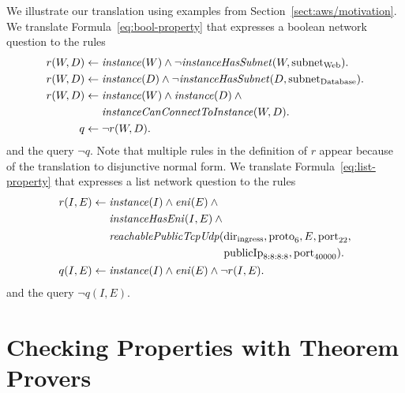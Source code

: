 We illustrate our translation using examples from Section~\ref{sect:aws/motivation}. We translate Formula~\ref{eq:bool-property} that expresses a boolean network question to the \Datalog rules
\begin{align*}
r(W,D)\mathrel{\leftarrow}\;& \mathit{instance}({W})\wedge\neg\mathit{instanceHasSubnet}(W,\mathrm{subnet}_\text{Web}).\\
r(W,D)\mathrel{\leftarrow}\;& \mathit{instance}({D})\wedge\neg\mathit{instanceHasSubnet}(D,\mathrm{subnet}_\text{Database}).\\
r(W,D)\mathrel{\leftarrow}\;& \mathit{instance}({W})\wedge\mathit{instance}({D})\:\wedge\:\\
           & \mathit{instanceCanConnectToInstance}(W,D).\\
q\mathrel{\leftarrow}\;& \neg r(W,D).
\end{align*}
and the \Datalog query $\neg q$. Note that multiple rules in the definition of $r$ appear because of the translation to disjunctive normal form. We translate Formula~\ref{eq:list-property} that expresses a list network question to the \Datalog rules
\begin{align*}
r(I,E)\mathrel{\leftarrow}\;& \mathit{instance}({I})\wedge\mathit{eni}({E})\:\wedge\:\\
           & \mathit{instanceHasEni}(I,E)\:\wedge\:\\
           &\begin{aligned}
               \mathit{reachablePublicTcpUdp}(&\mathrm{dir}_\text{ingress},\mathrm{proto}_6,E,\mathrm{port}_{22},\\
                                            &\mathrm{publicIp}_\text{8:8:8:8},\mathrm{port}_\text{40000}).
             \end{aligned}\\
q(I,E)\mathrel{\leftarrow}\;& \mathit{instance}({I})\wedge\mathit{eni}({E})\wedge\neg r(I,E).
\end{align*}
and the \Datalog query $\neg q(I,E)$.


\section{Checking Properties with Theorem Provers}
\label{sect:aws/fol}

